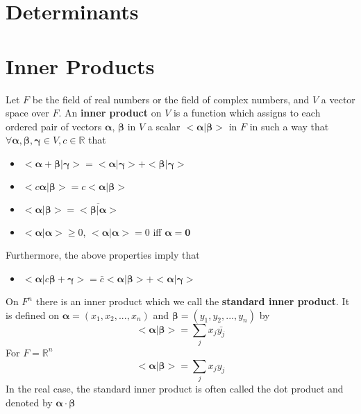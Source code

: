 			\section{Determinants}
				\subsection{}

			\section{Inner Products}
				\begin{definition}
					Let $F$ be the field of real numbers or the field of complex numbers, and $V$ a vector space over $F$. An \textbf{inner product} on $V$ is a function which assigns to each ordered pair of vectors $\mathbf{\alpha}$, $\mathbf{\beta}$ in $V$ a scalar $<\mathbf{\alpha}|\mathbf{\beta}>$ in $F$ in such a way that $\forall \mathbf{\alpha}, \mathbf{\beta}, \mathbf{\gamma} \in V, c \in \mathbb{R}$ that
					\begin{itemize}
						\item $<\mathbf{\alpha}+\mathbf{\beta}|\mathbf{\gamma}> = <\mathbf{\alpha}|\mathbf{\gamma}> + <\mathbf{\beta}|\mathbf{\gamma}>$
						\item $<c\mathbf{\alpha}|\mathbf{\beta}> = c<\mathbf{\alpha}|\mathbf{\beta}>$
						\item $<\mathbf{\alpha}|\mathbf{\beta}> = \overline{<\mathbf{\beta}|\mathbf{\alpha}>}$
						\item $<\mathbf{\alpha}|\mathbf{\alpha}> \ge 0$, $<\mathbf{\alpha}|\mathbf{\alpha}> = 0$ iff $\mathbf{\alpha} = \mathbf{0}$
					\end{itemize}
					Furthermore, the above properties imply that
					\begin{itemize}
						\item $<\mathbf{\alpha}|c\mathbf{\beta}+\mathbf{\gamma}> = \bar{c}<\mathbf{\alpha}|\mathbf{\beta}> + <\mathbf{\alpha}|\mathbf{\gamma}>$
					\end{itemize}
				\end{definition}

				\begin{definition}
					On $F^n$ there is an inner product which we call the \textbf{standard inner product}. It is defined on $\mathbf{\alpha} = (x_1, x_2, ..., x_n)$ and $\mathbf{\beta} = (y_1, y_2, ..., y_n)$ by
					\begin{equation}
						<\mathbf{\alpha}|\mathbf{\beta}> = \sum_j x_j \bar{y_j}
					\end{equation}
					For $F = \mathbb{R}^n$
					\begin{equation}
						<\mathbf{\alpha}|\mathbf{\beta}> = \sum_j x_j y_j
					\end{equation}
					In the real case, the standard inner product is often called the dot product and denoted by $\mathbf{\alpha} \cdot \mathbf{\beta}$
				\end{definition}

